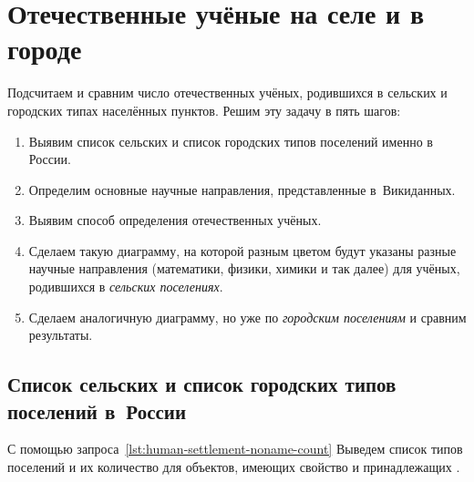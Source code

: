 \newpage

\section{Отечественные учёные на селе и в городе}

Подсчитаем и сравним число отечественных учёных, родившихся в сельских и городских типах населённых пунктов. 
Решим эту задачу в пять шагов:
\begin{enumerate}
  \item Выявим список сельских и список городских типов поселений именно в России.
  \item Определим основные научные направления, представленные в~Викиданных.
  \item Выявим способ определения отечественных учёных.
  \item Сделаем такую диаграмму, на которой разным цветом будут указаны разные научные направления (математики, физики, химики и так далее) для учёных, родившихся в \emph{сельских поселениях}.
  \item Сделаем аналогичную диаграмму, но уже по \emph{городским поселениям} и сравним результаты.
\end{enumerate}


\subsection{Список сельских и список городских типов поселений в~России}

С помощью запроса~\ref{lst:human-settlement-noname-count} 
Выведем список типов поселений и их количество для объектов, 
имеющих свойство  
и принадлежащих . 

